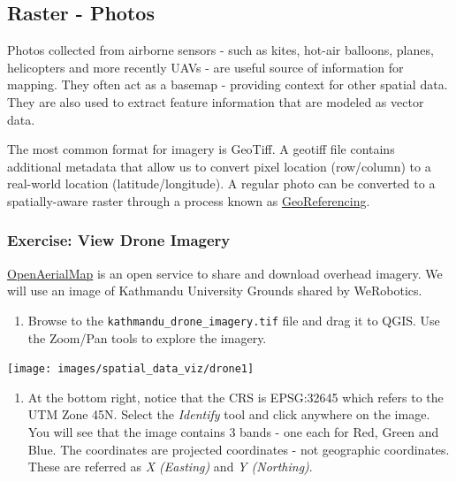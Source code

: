 \documentclass[
  12pt,
  a4paper]{article}
\providecommand{\tightlist}{%
  \setlength{\itemsep}{0pt}\setlength{\parskip}{0pt}}
\begin{document}
\newpage

\hypertarget{raster---photos}{%
\subsection{Raster - Photos}\label{raster---photos}}

Photos collected from airborne sensors - such as kites, hot-air
balloons, planes, helicopters and more recently UAVs - are useful source
of information for mapping. They often act as a basemap - providing
context for other spatial data. They are also used to extract feature
information that are modeled as vector data.

The most common format for imagery is GeoTiff. A geotiff file contains
additional metadata that allow us to convert pixel location (row/column)
to a real-world location (latitude/longitude). A regular photo can be
converted to a spatially-aware raster through a process known as
\href{https://en.wikipedia.org/wiki/Georeferencing}{GeoReferencing}.

\hypertarget{exercise-view-drone-imagery}{%
\subsubsection{Exercise: View Drone
Imagery}\label{exercise-view-drone-imagery}}

\href{https://openaerialmap.org/}{OpenAerialMap} is an open service to
share and download overhead imagery. We will use an image of Kathmandu
University Grounds shared by WeRobotics.

\begin{enumerate}
\def\labelenumi{\arabic{enumi}.}
\tightlist
\item
  Browse to the \texttt{kathmandu\_drone\_imagery.tif} file and drag it
  to QGIS. Use the Zoom/Pan tools to explore the imagery.
\end{enumerate}

\begin{center}\texttt{[image: images/spatial\_data\_viz/drone1]} \end{center}

\begin{enumerate}
\def\labelenumi{\arabic{enumi}.}
\setcounter{enumi}{1}
\tightlist
\item
  At the bottom right, notice that the CRS is EPSG:32645 which refers to
  the UTM Zone 45N. Select the \emph{Identify} tool and click anywhere
  on the image. You will see that the image contains 3 bands - one each
  for Red, Green and Blue. The coordinates are projected coordinates -
  not geographic coordinates. These are referred as \emph{X (Easting)}
  and \emph{Y (Northing)}.
\end{enumerate}
\end{document}
